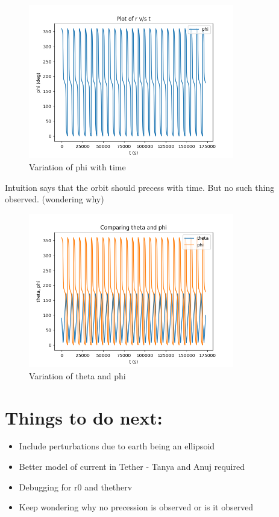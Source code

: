 \documentclass[11pt, a4paper]{article}
\begin{document}
\begin{figure}[H]
 \centering
 \includegraphics[width = 0.8\textwidth]{2dayp_.png}
 \caption{Variation of phi with time}
\end{figure}

Intuition says that the orbit should precess with time. But no such thing observed. (wondering why)

\begin{figure}[H]
 \centering
 \includegraphics[width = 0.8\textwidth]{2dayt_p_.png}
 \caption{Variation of theta and phi}
\end{figure}


\section{Things to do next:}
\begin{itemize}
 \item Include perturbations due to earth being an ellipsoid
 \item Better model of current in Tether - Tanya and Anuj required
 \item Debugging for r0 and thetherv
 \item Keep wondering why no precession is observed or is it observed
\end{itemize}
\end{document}
